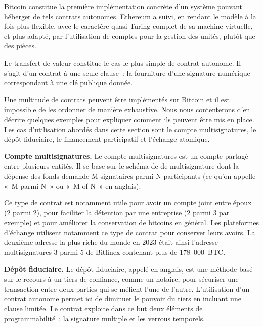 Bitcoin constitue la première implémentation concrète d'un système pouvant héberger de tels contrats autonomes. Ethereum a suivi, en rendant le modèle à la fois plus flexible, avec le caractère quasi-Turing complet de sa machine virtuelle, et plus adapté, par l'utilisation de comptes pour la gestion des unités, plutôt que des pièces.

Le transfert de valeur constitue le cas le plus simple de contrat autonome. Il s'agit d'un contrat à une seule clause~: la fourniture d'une signature numérique correspondant à une clé publique donnée.

Une multitude de contrats peuvent être implémentés sur Bitcoin et il est impossible de les ordonner de manière exhaustive. Nous nous contenterons d'en décrire quelques exemples pour expliquer comment ils peuvent être mis en place. Les cas d'utilisation abordés dans cette section sont le compte multisignatures, le dépôt fiduciaire, le financement participatif et l'échange atomique.


\textbf{Compte multisignatures.} Le compte multisignatures est un compte partagé entre plusieurs entités. Il se base sur le schéma de de multisignature dont la dépense des fonds demande M signataires parmi N participants (ce qu'on appelle «~M-parmi-N~» ou «~M-of-N~» en anglais).

Ce type de contrat est notamment utile pour avoir un compte joint entre époux (2 parmi 2), pour faciliter la détention par une entreprise (2 parmi 3 par exemple) et pour améliorer la conservation de bitcoins en général. Les plateformes d'échange utilisent notamment ce type de contrat pour conserver leurs avoirs. La deuxième adresse la plus riche du monde en 2023 était ainsi l'adresse multisignatures 3-parmi-5 de Bitfinex contenant plus de 178~000~BTC.


\textbf{Dépôt fiduciaire.} Le dépôt fiduciaire, appelé  en anglais, est une méthode basé sur le recours à un tiers de confiance, comme un notaire, pour sécuriser une transaction entre deux parties qui se méfient l'une de l'autre. L'utilisation d'un contrat autonome permet ici de diminuer le pouvoir du tiers en incluant une clause limitée. Le contrat exploite dans ce but deux éléments de programmabilité~: la signature multiple et les verrous temporels.

